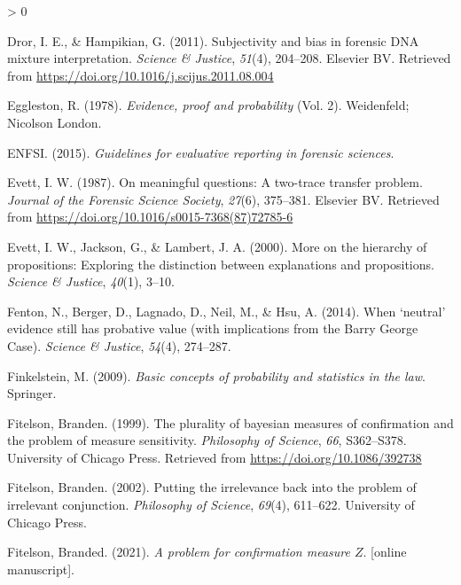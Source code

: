 \documentclass[
  10pt,
  dvipsnames,enabledeprecatedfontcommands]{scrartcl}
\newlength{\cslhangindent}
\newenvironment{CSLReferences}[2] %
 {%
  \setlength{\parindent}{0pt}
  \ifodd #1 \everypar{\setlength{\hangindent}{\cslhangindent}}\ignorespaces\fi
  \ifnum #2 > 0
  \setlength{\parskip}{#2\baselineskip}
  \fi
 }%
 {}
\begin{document}
\begin{CSLReferences}{1}{0}
\leavevmode\hypertarget{ref-Dror2011subjectivity}{}%
Dror, I. E., \& Hampikian, G. (2011). Subjectivity and bias in forensic
{DNA} mixture interpretation. \emph{Science {\&} Justice}, \emph{51}(4),
204--208. Elsevier {BV}. Retrieved from
\url{https://doi.org/10.1016/j.scijus.2011.08.004}

\leavevmode\hypertarget{ref-eggleston1978evidence}{}%
Eggleston, R. (1978). \emph{Evidence, proof and probability} (Vol. 2).
Weidenfeld; Nicolson London.

\leavevmode\hypertarget{ref-enfs2015}{}%
ENFSI. (2015). \emph{Guidelines for evaluative reporting in forensic
sciences}.

\leavevmode\hypertarget{ref-Evett1987}{}%
Evett, I. W. (1987). On meaningful questions: A two-trace transfer
problem. \emph{Journal of the Forensic Science Society}, \emph{27}(6),
375--381. Elsevier {BV}. Retrieved from
\url{https://doi.org/10.1016/s0015-7368(87)72785-6}

\leavevmode\hypertarget{ref-evett2000MoreHierarchyPropositions}{}%
Evett, I. W., Jackson, G., \& Lambert, J. A. (2000). More on the
hierarchy of propositions: Exploring the distinction between
explanations and propositions. \emph{Science \& Justice}, \emph{40}(1),
3--10.

\leavevmode\hypertarget{ref-fenton2014WhenNeutralEvidence}{}%
Fenton, N., Berger, D., Lagnado, D., Neil, M., \& Hsu, A. (2014). When
{`neutral'} evidence still has probative value (with implications from
the {Barry George Case}). \emph{Science \& Justice}, \emph{54}(4),
274--287.

\leavevmode\hypertarget{ref-finkelstein2009basic}{}%
Finkelstein, M. (2009). \emph{Basic concepts of probability and
statistics in the law}. Springer.

\leavevmode\hypertarget{ref-Fitelson1999plurality}{}%
Fitelson, Branden. (1999). The plurality of bayesian measures of
confirmation and the problem of measure sensitivity. \emph{Philosophy of
Science}, \emph{66}, S362--S378. University of Chicago Press. Retrieved
from \url{https://doi.org/10.1086/392738}

\leavevmode\hypertarget{ref-Fitelson2002irrelevance}{}%
Fitelson, Branden. (2002). Putting the irrelevance back into the problem
of irrelevant conjunction. \emph{Philosophy of Science}, \emph{69}(4),
611--622. University of Chicago Press.

\leavevmode\hypertarget{ref-Fitelson2021z_measure}{}%
Fitelson, Branded. (2021). \emph{A problem for confirmation measure
\(Z\)}. {[}online manuscript{]}.


\end{CSLReferences}
\end{document}
